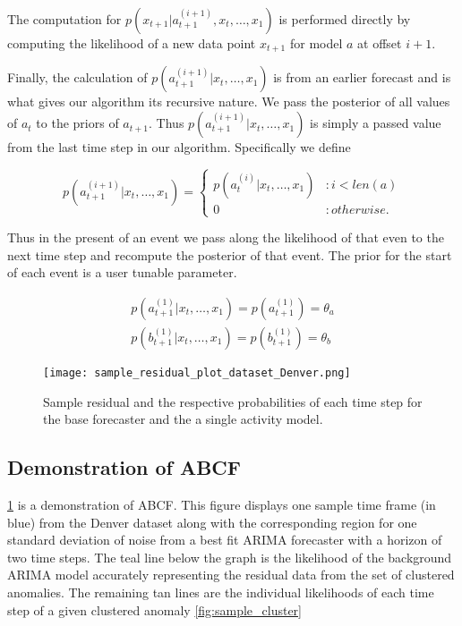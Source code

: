 The computation for $p(x_{t + 1}|a^{(i + 1)}_{t + 1}, x_{t}, \ldots, x_{1})$ is performed directly by computing the likelihood of a new data point $x_{t + 1}$ for model $a$ at offset $i + 1$.

Finally, the calculation of $p(a_{t + 1}^{(i + 1)}|x_{t}, \ldots, x_{1})$ is from an earlier forecast and is what gives our algorithm its recursive nature.  We pass the posterior of all values of $a_{t}$ to the priors of $a_{t + 1}.$  Thus $p(a_{t + 1}^{(i + 1)}|x_{t}, \ldots, x_{1})$ is simply a passed value from the last time step in our algorithm.  Specifically we define 

\begin{equation}
	p(a_{t + 1}^{(i + 1)} | x_{t}, \ldots, x_{1}) = 
		\begin{cases}
			p(a_{t}^{(i)}|x_{t}, \ldots, x_{1}) & : i < len(a) \\
			0 & : otherwise.
		\end{cases}
\end{equation}

Thus in the present of an event we pass along the likelihood of that even to the next time step and recompute the posterior of that event.  The prior for the start of each event is a user tunable parameter.  

\begin{equation}
	\begin{split}
		p(a_{t + 1}^{(1)}|x_{t}, \ldots, x_{1}) = p(a_{t + 1}^{(1)}) = \theta_a \\
		p(b_{t + 1}^{(1)}|x_{t}, \ldots, x_{1}) = p(b_{t + 1}^{(1)}) = \theta_b
	\end{split}
\end{equation}



\begin{figure}[!t]
	\begin{center}
		\texttt{[image: sample\_residual\_plot\_dataset\_Denver.png]}
	\end{center}
	\caption{Sample residual and the respective probabilities of each time step for the base forecaster and the a single activity model.}
	\label{fig:sample_abcf_residual}
\end{figure}

\subsection{Demonstration of ABCF}
\ref{fig:sample_abcf_residual} is a demonstration of ABCF.  This figure displays one sample time frame (in blue) from the Denver dataset along with the corresponding region for one standard deviation of noise from a best fit ARIMA forecaster with a horizon of two time steps.  The teal line below the graph is the likelihood of the background ARIMA model accurately representing the residual data from the set of clustered anomalies.  The remaining tan lines are the individual likelihoods of each time step of a given clustered anomaly \ref{fig:sample_cluster}  

